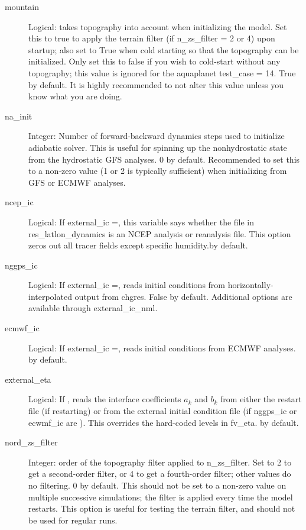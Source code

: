 \documentclass[12pt,letterpaper]{book}
\newcommand{\redtext}[1]{\textcolor{red}{[#1]}}  %
\begin{document}
\begin{description}
\item[mountain] Logical: takes topography into account when initializing the model. Set this to true to apply the terrain filter 
(if n\_zs\_filter = 2 or 4) upon startup; also set to True when cold starting so that the topography can be initialized. Only set this to false if you wish to cold-start without any topography; this value is ignored for the aquaplanet test\_case 
= 14. True by default. It is highly recommended to not alter this value unless you know what you are doing. 


\item[na\_init] Integer: Number of forward-backward dynamics steps used to initialize adiabatic solver. This is useful for spinning up the nonhydrostatic state from the hydrostatic GFS analyses.
0 by default. Recommended to set this to a non-zero value (1 or 2 is typically sufficient) when initializing from GFS or ECMWF analyses.


\item[ncep\_ic] Logical: If external\_ic =\true , this variable says whether the file in res\_latlon\_dynamics is an NCEP analysis or reanalysis file. This option zeros out all tracer fields except specific humidity.\false  by default. 


\item[nggps\_ic] Logical: If external\_ic =\true , reads initial conditions from horizontally-interpolated output from chgres. False by default. Additional options are available through external\_ic\_nml.

\item[ecmwf\_ic] Logical: If external\_ic =\true , reads initial conditions from ECMWF analyses. %
\false  by default. 

\item[external\_eta] Logical: If \true , reads the interface coefficients $a_k$ and $b_k$ from either the restart file (if restarting) or from the external initial condition file (if nggps\_ic or ecwmf\_ic are \true ). This overrides the hard-coded levels in fv\_eta. \false  by default. 

\item[nord\_zs\_filter] Integer: order of the topography filter applied to n\_zs\_filter. Set to 
2 to get a second-order filter, or 4 to get a fourth-order filter; other values do no filtering. 
0 by default. This should not be set to a non-zero value on multiple successive simulations; the filter is applied every time the model restarts. This option is useful for testing the terrain filter, and should not be used for regular runs.



\end{description}
\end{document}
